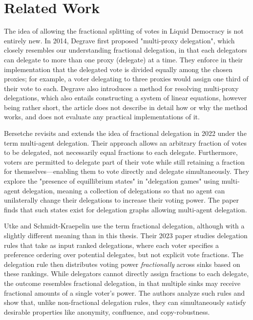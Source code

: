 
\chapter{Related Work}
\label{chap:related_work}

The idea of allowing the fractional splitting of votes in Liquid Democracy is not entirely new. In 2014, Degrave first proposed "multi-proxy delegation", which closely resembles our understanding fractional delegation, in that each delegators can delegate to more than one proxy (delegate) at a time. They enforce in their implementation that the delegated vote is divided equally among the chosen proxies; for example, a voter delegating to three proxies would assign one third of their vote to each. Degrave also introduces a method for resolving multi-proxy delegations, which also entails constructing a system of linear equations, however being rather short, the article does not describe in detail how or why the method works, and does not evaluate any practical implementations of it. \cite{degraveResolvingMultiproxyTransitive2014}

Bersetche revisits and extends the idea of fractional delegation in 2022 under the term multi-agent delegation. Their approach allows an arbitrary fraction of votes to be delegated, not necessarily equal fractions to each delegate. Furthermore, voters are permitted to delegate part of their vote while still retaining a fraction for themselves—enabling them to vote directly and delegate simultaneously. They explore the "presence of equillibrium states" in "delegation games" using multi-agent delegation, meaning a collection of delegations so that no agent can unilaterally change their delegations to increase their voting power. The paper finds that such states exist for delegation graphs allowing multi-agent delegation.  \cite{bersetcheGeneralizingLiquidDemocracy2022}

Utke and Schmidt-Kraepelin use the term fractional delegation, although with a slightly different meaning than in this thesis. Their 2023 paper studies delegation rules that take as input ranked delegations, where each voter specifies a preference ordering over potential delegates, but not explicit vote fractions. The delegation rule then distributes voting power \textit{fractionally} across sinks based on these rankings. While delegators cannot directly assign fractions to each delegate, the outcome resembles fractional delegation, in that multiple sinks may receive fractional amounts of a single voter's power. The authors analyze such rules and show that, unlike non-fractional delegation rules, they can simultaneously satisfy desirable properties like anonymity, confluence, and copy-robustness. \cite{NEURIPS2023_dbb51809}

